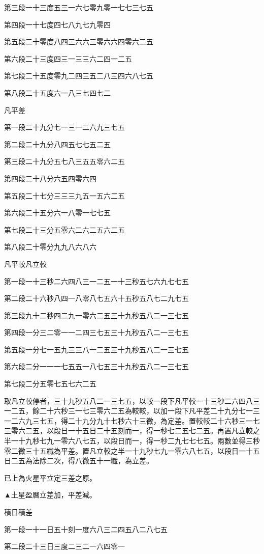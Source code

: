 第三段一十三度五三一六七零九零一七七三七五

第四段一十七度四七八九七九零四

第五段二十零度八四三六六三零六六四零六二五

第六段二十三度四三一三三六二四一二五

第七段二十五度零九二四三五二八三四六八七五

第八段二十五度六一八三七四七二

凡平差

第一段二十九分七一三一二六九三七五

第二段二十九分八四五七七五二五

第三段二十九分五七八三五五零六二五

第四段二十八分六五四零六四

第五段二十七分三三三九五一五六二五

第六段二十五分六一八零一七七五

第七段二十三分五零六二六二五六二五

第八段二十零分九九八六八六

凡平較凡立較

第一段一十三秒二六四八三一二五一十三秒五七六九七七五

第二段二十六秒八四一八零八七五六十五秒五八七二九七五

第三段九十二秒四二九一零六二五三十九秒五八二一三七五

第四段一分三二零一一二四三七五三十九秒五八二一三七五

第五段一分七一五九三三八一二五三十九秒五八二一三七五

第六段二分一一一七五五一八七五三十九秒五八二一三七五

第七段二分五零七五七六二五

取凡立較停者，三十九秒五八二一三七五，以較一段下凡平較一十三秒二六四八三一二五，餘二十六秒三一七三零六二五為較較，以加一段下凡平差二十九分七一三一二六九三七五，得二十九分九十七秒六十三微，為定差。置較較二十六秒三一七三零六二五，以段日一十五日二十五刻而一，得一秒七二五七二五。再置凡立較之半一十九秒七九一零六八七五，以段日而一，得一秒二九七七七五。兩數並得三秒零二微三十五纖為平差。置凡立較之半一十九秒七九一零六八七五，以段日一十五日二五為法除二次，得八微五十一纖，為立差。

已上為火星平立定三差之原。

▲土星盈曆立差加，平差減。

積日積差

第一段一十一日五十刻一度六八三二四五八二八七五

第二段二十三日三度二三二一六四零一

